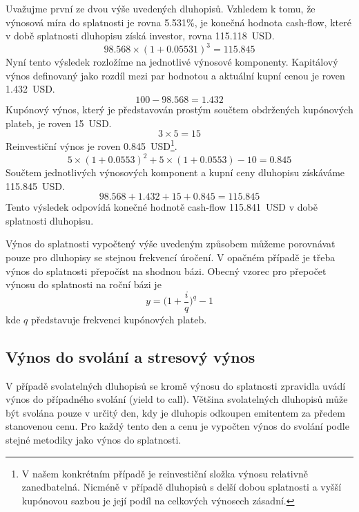 \documentclass[a4paper]{book}
\begin{document}
Uvažujme první ze dvou výše uvedených dluhopisů. Vzhledem k tomu, že výnosová míra do splatnosti je rovna 5.531\%, je konečná hodnota cash-flow, které v době splatnosti dluhopisu získá investor, rovna 115.118~USD.
\begin{equation*}
98.568 \times (1 + 0.05531)^3 = 115.845
\end{equation*}
Nyní tento výsledek rozložíme na jednotlivé výnosové komponenty. Kapitálový výnos definovaný jako rozdíl mezi par hodnotou a aktuální kupní cenou je roven 1.432~USD.
\begin{equation*}
100 - 98.568 = 1.432
\end{equation*}
Kupónový výnos, který je představován prostým součtem obdržených kupónových plateb, je roven 15~USD.
\begin{equation*}
3 \times 5 = 15
\end{equation*}
Reinvestiční výnos je roven 0.845~USD\footnote{V našem konkrétním případě je reinvestiční složka výnosu relativně zanedbatelná. Nicméně v případě dluhopisů s delší dobou splatnosti a vyšší kupónovou sazbou je její podíl na celkových výnosech zásadní.}.
\begin{equation*}
5 \times (1 + 0.0553)^2 + 5 \times (1 + 0.0553) - 10 = 0.845
\end{equation*}
Součtem jednotlivých výnosových komponent a kupní ceny dluhopisu získáváme 115.845~USD.
\begin{equation*}
98.568 + 1.432 + 15 + 0.845 = 115.845
\end{equation*}
Tento výsledek odpovídá konečné hodnotě cash-flow 115.841~USD v době splatnosti dluhopisu.

Výnos do splatnosti vypočtený výše uvedeným způsobem můžeme porovnávat pouze pro dluhopisy se stejnou frekvencí úročení. V opačném případě je třeba výnos do splatnosti přepočíst na shodnou bázi. Obecný vzorec pro přepočet výnosu do splatnosti na roční bázi je
\begin{equation}
y = \Big( 1 + \frac{i}{q}\Big)^q - 1
\end{equation}
kde $q$ představuje frekvenci kupónových plateb.

\subsection{Výnos do svolání a stresový výnos}

V případě svolatelných dluhopisů se kromě výnosu do splatnosti zpravidla uvádí výnos do případného svolání (yield to call). Většina svolatelných dluhopisů může být svolána pouze v určitý den, kdy je dluhopis odkoupen emitentem za předem stanovenou cenu. Pro každý tento den a cenu je vypočten výnos do svolání podle stejné metodiky jako výnos do splatnosti.
\end{document}
